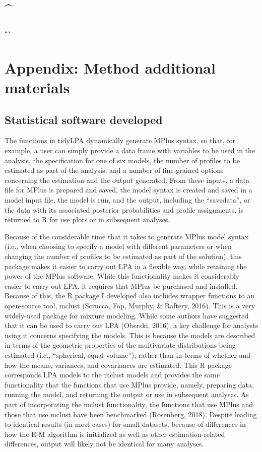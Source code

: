 \documentclass[]{book}
\theoremstyle{definition}
\theoremstyle{definition}
\theoremstyle{definition}
\theoremstyle{remark}
\begin{document}
\section{\^{}}\label{section}

```

\section{Appendix: Method additional
materials}\label{appendix-method-additional-materials}

\subsection{Statistical software
developed}\label{statistical-software-developed-1}

The functions in tidyLPA dynamically generate MPlus syntax, so that, for
example, a user can simply provide a data frame with variables to be
used in the analysis, the specification for one of six models, the
number of profiles to be estimated as part of the analysis, and a number
of fine-grained options concerning the estimation and the output
generated. From these inputs, a data file for MPlus is prepared and
saved, the model syntax is created and saved in a model input file, the
model is run, and the output, including the ``savedata'', or the data
with its associated posterior probabilities and profile assignments, is
returned to R for use plots or in subsequent analyses.

Because of the considerable time that it takes to generate MPlus model
syntax (i.e., when choosing to specify a model with different parameters
or when changing the number of profiles to be estimated as part of the
solution), this package makes it easier to carry out LPA in a flexible
way, while retaining the power of the MPlus software. While this
functionality makes it considerably easier to carry out LPA, it requires
that MPlus be purchased and installed. Because of this, the R package I
developed also includes wrapper functions to an open-source tool, mclust
(Scrucca, Fop, Murphy, \& Raftery, 2016). This is a very widely-used
package for mixture modeling. While some authors have suggested that it
can be used to carry out LPA (Oberski, 2016), a key challenge for
analysts using it concerns specifying the models. This is because the
models are described in terms of the geometric properties of the
multivariate distributions being estimated (i.e., ``spherical, equal
volume''), rather than in terms of whether and how the means, variances,
and covariances are estimated. This R package corresponds LPA models to
the mclust models and provides the same functionality that the functions
that use MPlus provide, namely, preparing data, running the model, and
returning the output or use in subsequent analyses. As part of
incorporating the mclust functionality, the functions that use MPlus and
those that use mclust have been benchmarked (Rosenberg, 2018). Despite
leading to identical results (in most cases) for small datasets, because
of differences in how the E-M algorithm is initialized as well as other
estimation-related differences, output will likely not be identical for
many analyses.
\end{document}
